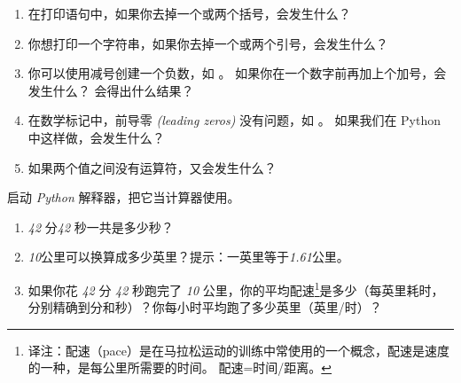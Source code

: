 \begin{exercise}
\begin{enumerate}

\item 在打印语句中，如果你去掉一个或两个括号，会发生什么？

\item 你想打印一个字符串，如果你去掉一个或两个引号，会发生什么？

\item 你可以使用减号创建一个负数，如 {\em {}} 。 如果你在一个数字前再加上个加号，会发生什么？ {\em {}} 会得出什么结果？

\item 在数学标记中，前导零 {\em (leading zeros)} 没有问题，如 {\em {}} 。 如果我们在 Python 中这样做，会发生什么？

\item 如果两个值之间没有运算符，又会发生什么？

\end{enumerate}

\end{exercise}



\begin{exercise}



启动 {\em Python} 解释器，把它当计算器使用。

\begin{enumerate}

\item {\em 42} 分{\em 42} 秒一共是多少秒？

\item {\em 10}公里可以换算成多少英里？提示：一英里等于{\em 1.61}公里。

\item 如果你花 {\em 42} 分 {\em 42} 秒跑完了 {\em 10} 公里，你的平均配速\footnote{译注：配速（pace）是在马拉松运动的训练中常使用的一个概念，配速是速度的一种，是每公里所需要的时间。 配速=时间/距离。 }是多少（每英里耗时，分别精确到分和秒）？你每小时平均跑了多少英里（英里/时）？

  
  

\end{enumerate}

\end{exercise}